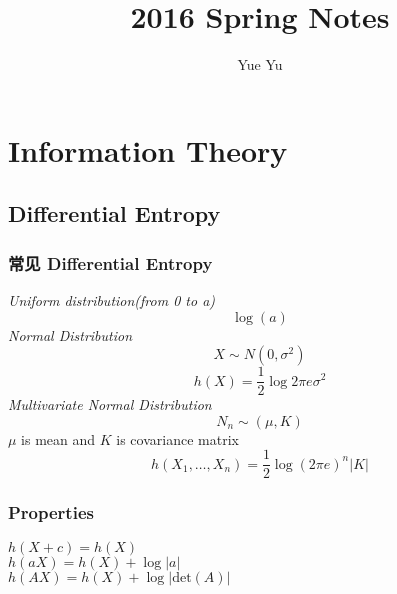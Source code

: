 \documentclass{article} 	%
\title{2016 Spring Notes}
\author{Yue Yu}
\begin{document}
\maketitle
\tableofcontents
\newpage


\section{Information Theory}

\subsection{Differential Entropy}


\subsubsection{常见 Differential Entropy}
\emph{Uniform distribution(from 0 to a)}
\[
\log(a)
\]
\emph{Normal Distribution}
\[
 X\sim N(0,\sigma^2)
 \]
 \[
 h(X) = \frac{1}{2} \log2\pi e \sigma^2 
\]
\emph{Multivariate Normal Distribution}
$$N_n\sim(\mu, K)$$
\qquad $\mu$ is mean and $K$ is covariance matrix
\[
h(X_1,\ldots,X_n) = \frac{1}{2}\log(2\pi e )^n |K|
\]

\subsubsection{Properties}
$h(X+c) = h(X)$\\
$h(aX) = h(X) + \log|a|$\\
$h(AX) = h(X) + \log\big|\mathrm{det}(A)\big|$
\end{document}

